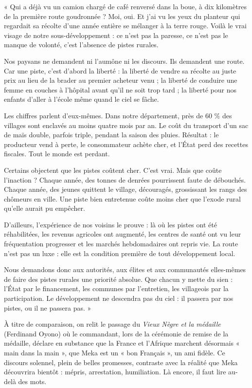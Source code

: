 \documentclass[11pt]{article}
\begin{document}
\begin{exemplebox}
« Qui a déjà vu un camion chargé de café renversé dans la boue, à dix kilomètres de la première route goudronnée ? Moi, oui. Et j'ai vu les yeux du planteur qui regardait sa récolte d'une année entière se mélanger à la terre rouge. Voilà le vrai visage de notre sous-développement : ce n'est pas la paresse, ce n'est pas le manque de volonté, c'est l'absence de pistes rurales.

Nos paysans ne demandent ni l'aumône ni les discours. Ils demandent une route. Car une piste, c'est d'abord la liberté : la liberté de vendre sa récolte au juste prix au lieu de la brader au premier acheteur venu ; la liberté de conduire une femme en couches à l'hôpital avant qu'il ne soit trop tard ; la liberté pour nos enfants d'aller à l'école même quand le ciel se fâche.

Les chiffres parlent d'eux-mêmes. Dans notre département, près de 60 \% des villages sont enclavés au moins quatre mois par an. Le coût du transport d'un sac de maïs double, parfois triple, pendant la saison des pluies. Résultat : le producteur vend à perte, le consommateur achète cher, et l'État perd des recettes fiscales. Tout le monde est perdant.

Certains objectent que les pistes coûtent cher. C'est vrai. Mais que coûte l'inaction ? Chaque année, des tonnes de denrées pourrissent faute de débouchés. Chaque année, des jeunes quittent le village, découragés, grossissant les rangs des chômeurs en ville. Une piste bien entretenue coûte moins cher que l'exode rural qu'elle aurait pu empêcher.

D'ailleurs, l'expérience de nos voisins le prouve : là où les pistes ont été réhabilitées, les revenus agricoles ont augmenté, les centres de santé ont vu leur fréquentation progresser et les marchés hebdomadaires ont repris vie. La route n'est pas un luxe : elle est la condition première de tout développement local.

Nous demandons donc aux autorités, aux élites et aux communautés elles-mêmes de faire des pistes rurales une priorité absolue. Que chacun y mette du sien : l'État par le financement, les communes par l'entretien, les villageois par la participation. Le développement ne descendra pas du ciel : il passera par nos pistes, ou il ne passera pas. »
\end{exemplebox}

À titre de comparaison, on relit le passage du \emph{Vieux Nègre et la médaille} (Ferdinand Oyono) où le commandant, lors de la cérémonie de remise de la médaille, déclare en substance que la France et l'Afrique marchent désormais « main dans la main », que Meka est un « bon Français », un ami fidèle. Ce discours solennel, plein de belles promesses, contraste avec la réalité que Meka découvrira bientôt : mépris, arrestation, humiliation. Là encore, il faut lire au-delà des mots.
\end{document}
